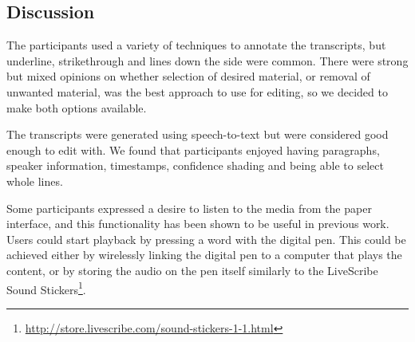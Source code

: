 




\subsection{Discussion}
The participants used a variety of techniques to annotate the transcripts, but underline, strikethrough and lines down
the side were common. There were strong but mixed opinions on whether selection of desired material, or removal of
unwanted material, was the best approach to use for editing, so we decided to make both options available.


The transcripts were generated using speech-to-text but were considered good enough to edit with. We found that
participants enjoyed having paragraphs, speaker information, timestamps, confidence shading and being able to select
whole lines.

Some participants expressed a desire to listen to the media from the paper interface, and this functionality has been
shown to be useful in previous work. %
Users could start playback by pressing a word with the digital pen. This could be
achieved either by wirelessly linking the digital pen to a computer that plays the content, or by storing the audio on
the pen itself similarly to the LiveScribe Sound
Stickers\footnote{\url{http://store.livescribe.com/sound-stickers-1-1.html}}.

